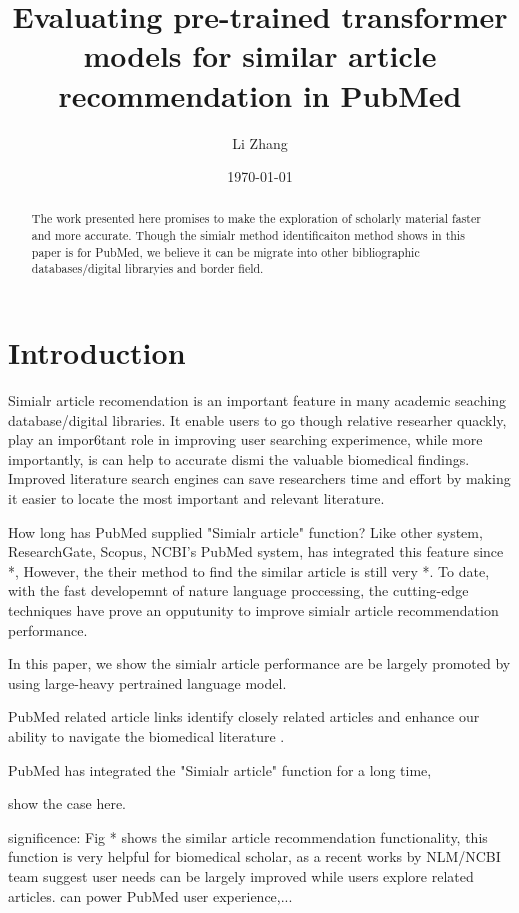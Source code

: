 \documentclass[11pt]{article}
\title{Evaluating pre-trained transformer models for similar article recommendation in PubMed}
\author{Li Zhang}
\date{\today}
\begin{document}
    \maketitle

    \begin{abstract}
        The work presented here promises to make the exploration of scholarly material faster and more accurate.
        Though the simialr method identificaiton method shows in this paper is for PubMed, we believe it can be migrate into other bibliographic databases/digital libraryies and border field.
    \end{abstract}

    \newpage


    \section{Introduction}
    Simialr article recomendation is an important feature in many academic seaching database/digital libraries. It enable users to go though relative researher quackly, play an impor6tant role in improving user searching experimence, while more importantly, is can help to accurate dismi the valuable biomedical findings.
    Improved literature search engines can save researchers time and effort by making it easier to locate the most important and relevant literature. \cite{2006Text}

    How long has PubMed supplied "Simialr article" function?
    Like other system, ResearchGate, Scopus, NCBI's PubMed system, has integrated this feature since *, However, the their method to find the similar article is still very *. To date, with the fast developemnt of
    nature language proccessing, the cutting-edge techniques have prove an opputunity to improve simialr article recommendation performance.


    In this paper, we show the simialr article performance are be largely promoted by using large-heavy pertrained language model.

    PubMed related article links identify closely related articles and enhance our ability to navigate the biomedical literature \cite{Enriching2009}.

    PubMed has integrated the "Simialr article" function for a long time,

    show the case here.

    significence:
    Fig * shows the similar article recommendation functionality, this function is very helpful for biomedical scholar, as a recent works by NLM/NCBI team suggest user needs can be largely improved while users explore related articles.
    can power PubMed user experience,...
\end{document}
